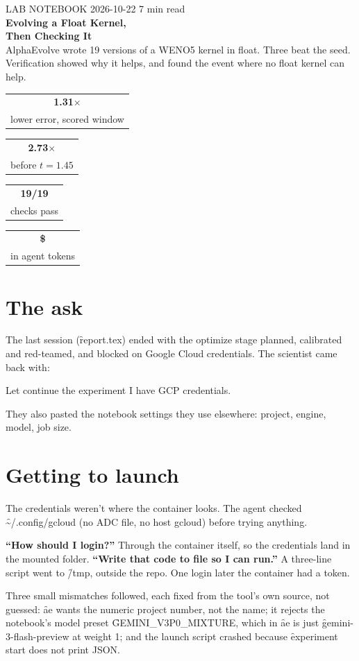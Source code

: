 \documentclass{../style}
\makeatletter
\newcommand{\stat}[2]{\begin{tabular}[t]{@{}c@{}}{\huge\bfseries\color{accent}#1}\\[2pt]{\small\color{muted}#2}\end{tabular}}
\newcommand{\who}[1]{\textbf{\color{accent}#1}}
\makeatother
\begin{document}
{\small\color{muted}LAB NOTEBOOK \textbullet{} 2026-10-22 \textbullet{} 7 min read}\\[4pt]
{\fontsize{26}{30}\selectfont\bfseries\color{ink} Evolving a Float Kernel,\\ Then Checking It}\\[6pt]
{\large\color{muted} AlphaEvolve wrote 19 versions of a WENO5 kernel in float. Three beat the seed.
Verification showed why it helps, and found the event where no float kernel can help.}

\vspace{0.8em}
\begin{panel}
\centering
\stat{1.31$\times$}{lower error, scored window} \hfill \stat{2.73$\times$}{before $t=1.45$} \hfill
\stat{19/19}{checks pass} \hfill \stat{\$\usd}{in agent tokens}
\end{panel}

\section{The ask}

The last session (\f{report.tex}) ended with the optimize stage planned, calibrated and
red-teamed, and blocked on Google Cloud credentials. The scientist came back with:

\begin{quoteit}
Let continue the experiment I have GCP credentials.
\end{quoteit}

They also pasted the notebook settings they use elsewhere: project, engine, model, job size.

\section{Getting to launch}

The credentials weren't where the container looks. The agent checked \f{\textasciitilde/.config/gcloud}
(no ADC file, no host gcloud) before trying anything.

\who{``How should I login?''} Through the container itself, so the credentials land in the mounted
folder. \who{``Write that code to file so I can run.''} A three-line script went to \f{/tmp},
outside the repo. One login later the container had a token.

Three small mismatches followed, each fixed from the tool's own source, not guessed:
\f{ae} wants the numeric project number, not the name; it rejects the notebook's model preset
\f{GEMINI\_V3P0\_MIXTURE}, which in \f{ae} is just \f{gemini-3-flash-preview} at weight 1; and the
launch script crashed because \f{experiment start} does not print JSON.
\end{document}
